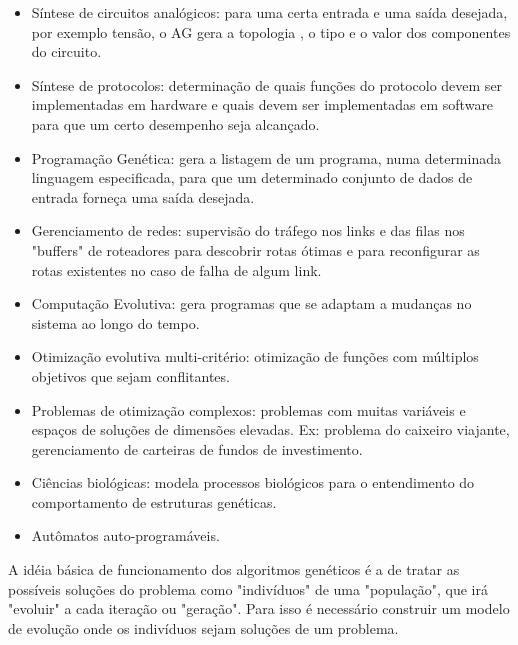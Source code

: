 \documentclass[conference]{IEEEtran}
\begin{document}
    \begin{itemize}
    \item Síntese de circuitos analógicos:  para uma certa entrada e uma saída desejada, por exemplo tensão, o AG gera a topologia , o tipo e o valor dos componentes do circuito.

    \item Síntese de protocolos:  determinação de quais funções do protocolo devem ser implementadas em hardware e quais devem ser implementadas em software para que um certo desempenho seja alcançado.

    \item Programação Genética: gera a listagem de um programa, numa determinada linguagem especificada, para que um determinado conjunto de dados de entrada forneça uma saída desejada.

    \item Gerenciamento de redes: supervisão do tráfego nos links e das filas nos "buffers" de roteadores para descobrir rotas ótimas e para reconfigurar as rotas existentes no caso de falha de algum link.

    \item Computação Evolutiva: gera programas que se adaptam a mudanças no sistema ao longo do tempo.

    \item Otimização evolutiva multi-critério: otimização de funções com múltiplos objetivos que sejam conflitantes.

    \item Problemas de otimização complexos: problemas com muitas variáveis e espaços de soluções de dimensões elevadas. Ex: problema do caixeiro viajante, gerenciamento de carteiras de fundos de investimento.

    \item Ciências biológicas:  modela processos biológicos para o entendimento do comportamento de estruturas genéticas.

    \item Autômatos auto-programáveis.
    \end{itemize}

A idéia básica de funcionamento dos algoritmos genéticos é a de tratar as possíveis soluções do problema como "indivíduos" de uma "população", que irá "evoluir" a cada iteração ou "geração". Para isso é necessário construir um modelo de evolução onde os indivíduos sejam soluções de um problema. 
\end{document}

